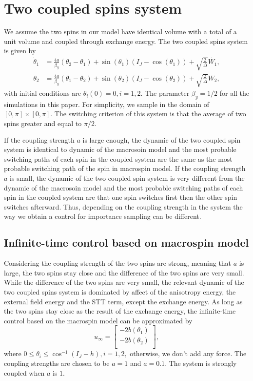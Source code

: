 \documentclass[journal,transmag]{IEEEtran}
\begin{document}
\section{Two coupled spins system}
We assume the two spins in our model have identical volume with a total of a unit volume and coupled through exchange energy.
The two coupled spins system is given by
\begin{align} \label{sys:N2}  \nonumber
 \dot{\theta}_1 &=\frac{4a}{\beta_y}( \theta_{2} -  \theta_{1} ) +\sin(\theta_1)(I_J - \cos(\theta_1)) + \sqrt{\frac{2}{{\Delta}}}\dot{W_1},\\  \nonumber
  \dot{\theta}_2 &=\frac{4a}{\beta_y}( \theta_{1} -  \theta_{2} ) +\sin(\theta_2)(I_J - \cos(\theta_2))+ \sqrt{ \frac{2}{{\Delta}}}\dot{W_2},
 \end{align}
with initial conditions are $\theta_i(0) = 0, i = 1,2.$ The parameter $\beta_y = 1/2$ for all the simulations in this paper. For simplicity, we sample in the domain of $[0,\pi] \times [0,\pi]$. The switching criterion of this system is that the average of two spins greater and equal to $\pi/2$.

If the coupling strength $a$ is large enough, the dynamic of the two coupled spin system is identical to dynamic of the macrosoin model and the most probable switching paths of each spin in the coupled system are the same as the most probable switching path of the spin in macrospin model. If the coupling strength $a$ is small, the dynamic of the two coupled spin system is very different from the dynamic of the macrosoin model and the most probable switching paths of each spin in the coupled system are that one spin switches first then the other spin switches afterward. Thus, depending on the coupling strength in the system the way we obtain a control for importance sampling can be different.
%
%
\subsection{Infinite-time control based on macrospin model}
Considering the coupling strength of the two spins are strong, meaning that $a$ is large, the two spins stay close and the difference of the two spins are very small. While the difference of the two spins are very small, the relevant dynamic of the two coupled spins system is dominated by affect of the anisotropy energy, the external field energy and the STT term, except the exchange energy. As long as the two spins stay close as the result of the exchange energy, the infinite-time control based on the macrospin model can be approximated by
 \begin{equation}
u_\infty= \left[ \begin {array}{c}
 -2b(\theta_1)\\
 -2b(\theta_2)\\
 \end {array}
 \right],
 \end{equation}
 where $ 0 \leqslant \theta_i \leqslant \cos^{-1}(I_J-h) , i = 1,2,$ otherwise, we don't add any force. The coupling strengths are chosen to be $ a = 1$ and $a = 0.1$. The system is strongly coupled when $a$ is $1$.
\end{document}
